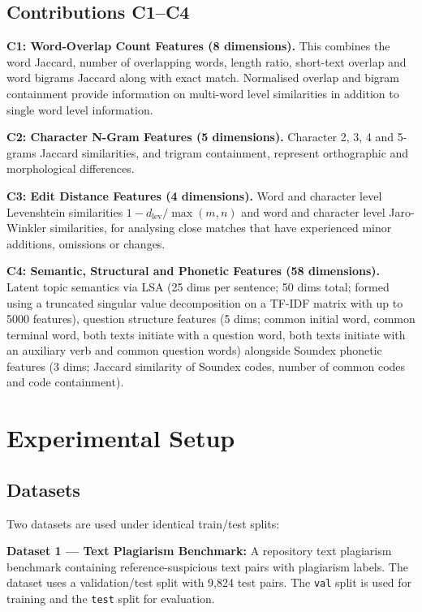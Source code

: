 \documentclass[conference]{IEEEtran}
\begin{document}
\subsection{Contributions C1--C4}
\noindent\textbf{C1: Word-Overlap Count Features (8 dimensions).}
This combines the word Jaccard, number of overlapping words, length
ratio, short-text overlap and word bigrams Jaccard along with
exact match. Normalised overlap and bigram containment provide
information on multi-word level similarities in addition to
single word level information.
\par\noindent\textbf{C2: Character N-Gram Features (5 dimensions).}
Character 2, 3, 4 and 5-grams Jaccard similarities, and trigram
containment, represent orthographic and morphological differences.
\par\noindent\textbf{C3: Edit Distance Features (4 dimensions).}
Word and character level Levenshtein similarities $1-d_{\mathrm{lev}}/\max(m,n)$ and
word and character level Jaro-Winkler similarities, for analysing
close matches that have experienced minor additions, omissions
or changes.
\par\noindent\textbf{C4: Semantic, Structural and Phonetic Features (58 dimensions).}
Latent topic semantics via LSA (25 dims per sentence; 50 dims total; formed using
a truncated singular value decomposition on a TF-IDF matrix with up to 5000 features),
question structure features (5 dims; common initial word, common terminal
word, both texts initiate with a question word, both texts
initiate with an auxiliary verb and common question words)
alongside Soundex phonetic features (3 dims; Jaccard similarity of
Soundex codes, number of common codes and code containment).


\section{Experimental Setup}

\subsection{Datasets}

Two datasets are used under identical train/test splits:

\textbf{Dataset 1 --- Text Plagiarism Benchmark:} A repository text plagiarism
benchmark containing reference-suspicious text pairs with plagiarism labels.
The dataset uses a validation/test split with 9,824 test pairs. The \texttt{val}
split is used for training and the \texttt{test} split for evaluation.
\end{document}
